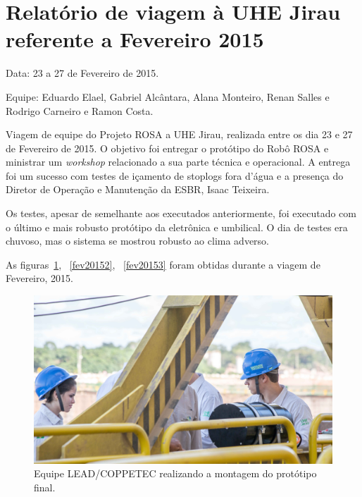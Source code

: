 \section{Relatório de viagem à UHE Jirau
referente a Fevereiro 2015}
Data: 23 a 27 de Fevereiro de 2015.

Equipe: Eduardo Elael, Gabriel Alcântara, Alana Monteiro, Renan Salles e Rodrigo Carneiro e Ramon Costa.


Viagem de equipe do Projeto ROSA a UHE Jirau, realizada entre
os dia 23 e 27 de Fevereiro de 2015. O objetivo foi entregar o protótipo do Robô
ROSA e ministrar um \textit{workshop} relacionado a sua parte técnica e
operacional. A entrega foi um sucesso com testes de içamento de stoplogs fora
d'água e a presença do Diretor de Operação e Manutenção da ESBR, Isaac Teixeira.

Os testes, apesar de semelhante aos executados anteriormente, foi executado com
o último e mais robusto protótipo da eletrônica e umbilical. O dia de testes era
chuvoso, mas o sistema se mostrou robusto ao clima adverso. 

As figuras~\ref{fev20151}, ~\ref{fev20152}, ~\ref{fev20153} foram obtidas durante a viagem
de Fevereiro, 2015. 

\begin{figure}[h!]
\centering
  \includegraphics[width=1\linewidth]{Fotos/Fevereiro2015/fev20151.jpg}
  \caption{Equipe LEAD/COPPETEC realizando a montagem do protótipo final.}
  \label{fev20151}
\end{figure}


